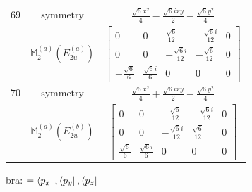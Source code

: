 \documentclass[fleqn,8pt,landscape]{jsarticle}
\begin{document}
\begin{longtable}{ccc}
$ 69 $ & $ \text{symmetry} $ & $ \frac{\sqrt{6} x^{2}}{4} - \frac{\sqrt{6} i x y}{2} - \frac{\sqrt{6} y^{2}}{4} $ \\
$  $ & $ \mathbb{M}_{2}^{(a)}(E_{2u}^{(a)}) $ & $ \begin{bmatrix} 0 & 0 & \frac{\sqrt{6}}{12} & - \frac{\sqrt{6} i}{12} & 0 \\ 0 & 0 & - \frac{\sqrt{6} i}{12} & - \frac{\sqrt{6}}{12} & 0 \\ - \frac{\sqrt{6}}{6} & \frac{\sqrt{6} i}{6} & 0 & 0 & 0 \end{bmatrix} $ \\ \hline
$ 70 $ & $ \text{symmetry} $ & $ \frac{\sqrt{6} x^{2}}{4} + \frac{\sqrt{6} i x y}{2} - \frac{\sqrt{6} y^{2}}{4} $ \\
$  $ & $ \mathbb{M}_{2}^{(a)}(E_{2u}^{(b)}) $ & $ \begin{bmatrix} 0 & 0 & - \frac{\sqrt{6}}{12} & - \frac{\sqrt{6} i}{12} & 0 \\ 0 & 0 & - \frac{\sqrt{6} i}{12} & \frac{\sqrt{6}}{12} & 0 \\ \frac{\sqrt{6}}{6} & \frac{\sqrt{6} i}{6} & 0 & 0 & 0 \end{bmatrix} $ \\ \hline
\end{longtable}
bra: $=\bra{p_{x}}, \bra{p_{y}}, \bra{p_{z}}$
\end{document}

